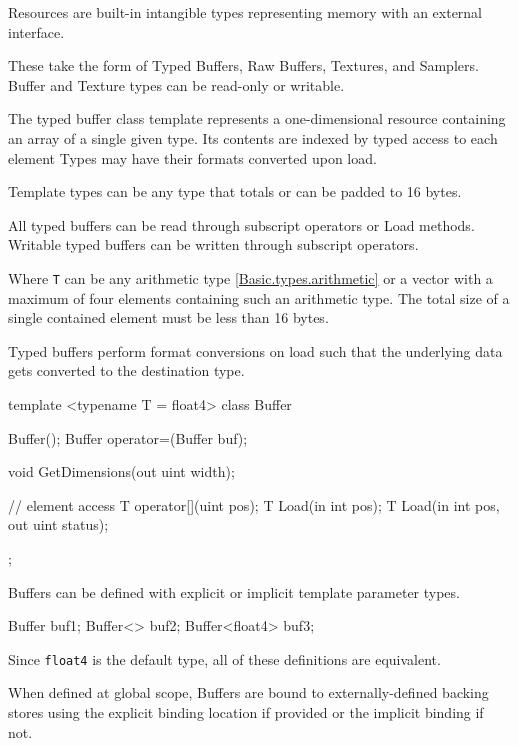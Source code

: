 
Resources are built-in intangible types representing memory with an external interface.

These take the form of Typed Buffers, Raw Buffers, Textures, and Samplers.
Buffer and Texture types can be read-only or writable.


The typed buffer class template represents a one-dimensional resource containing an array of a single given type.
Its contents are indexed by typed access to each element
Types may have their formats converted upon load.

Template types can be any type that totals or can be padded to 16 bytes.

All typed buffers can be read through subscript operators or Load methods.
Writable typed buffers can be written through subscript operators.

Where \texttt{T} can be any arithmetic type \ref{Basic.types.arithmetic}
or a vector with a maximum of four elements containing such an arithmetic type.
The total size of a single contained element must be less than 16 bytes.

Typed buffers perform format conversions on load such that the underlying data
gets converted to the destination type.


\begin{HLSL}
template <typename T = float4>
 class Buffer {
   Buffer();
   Buffer operator=(Buffer buf);

   void GetDimensions(out uint width);

   // element access
   T operator[](uint pos);
   T Load(in int pos);
   T Load(in int pos, out uint status);
};
\end{HLSL}


Buffers can be defined with explicit or implicit template parameter types.
\begin{HLSL}
  Buffer buf1;
  Buffer<> buf2;
  Buffer<float4> buf3;
\end{HLSL}
Since \texttt{float4} is the default type, all of these definitions are equivalent.

When defined at global scope, Buffers are bound to externally-defined backing stores
using the explicit binding location if provided or the implicit binding if not.

